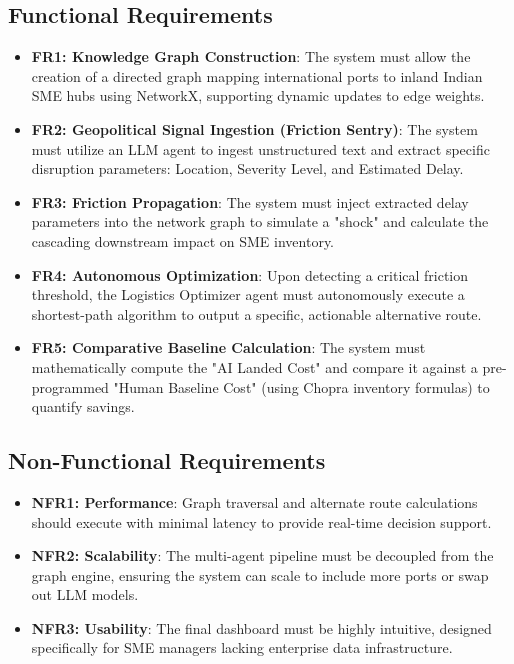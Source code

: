 \subsection[Functional Requirements]{Functional Requirements}
\begin{itemize}
\item \textbf{FR1: Knowledge Graph Construction}: The system must allow the creation of a directed graph mapping international ports to inland Indian SME hubs using NetworkX, supporting dynamic updates to edge weights.
\item \textbf{FR2: Geopolitical Signal Ingestion (Friction Sentry)}: The system must utilize an LLM agent to ingest unstructured text and extract specific disruption parameters: Location, Severity Level, and Estimated Delay.
\item \textbf{FR3: Friction Propagation}: The system must inject extracted delay parameters into the network graph to simulate a "shock" and calculate the cascading downstream impact on SME inventory.
\item \textbf{FR4: Autonomous Optimization}: Upon detecting a critical friction threshold, the Logistics Optimizer agent must autonomously execute a shortest-path algorithm to output a specific, actionable alternative route.
\item \textbf{FR5: Comparative Baseline Calculation}: The system must mathematically compute the "AI Landed Cost" and compare it against a pre-programmed "Human Baseline Cost" (using Chopra inventory formulas) to quantify savings.
\end{itemize}
\subsection[Non-Functional Requirements]{Non-Functional Requirements}
\begin{itemize}
\item \textbf{NFR1: Performance}: Graph traversal and alternate route calculations should execute with minimal latency to provide real-time decision support.
\item \textbf{NFR2: Scalability}: The multi-agent pipeline must be decoupled from the graph engine, ensuring the system can scale to include more ports or swap out LLM models.
\item \textbf{NFR3: Usability}: The final dashboard must be highly intuitive, designed specifically for SME managers lacking enterprise data infrastructure.
\end{itemize}
